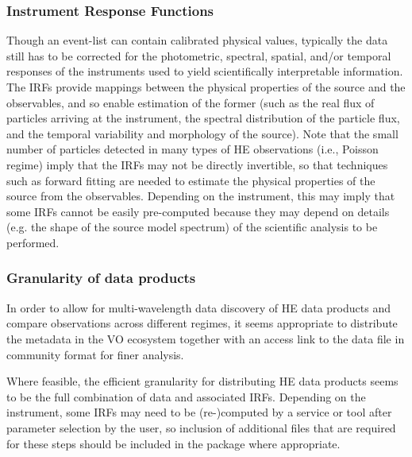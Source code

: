 \documentclass[11pt,a4paper]{ivoa}
\begin{document}
\subsubsection{Instrument Response Functions}

Though an event-list can contain calibrated physical values, typically the data still has to be corrected for the photometric, spectral, spatial, and/or temporal responses of the instruments used to yield scientifically interpretable information. The IRFs provide mappings between the physical properties of the source and the observables, and so enable estimation of the former (such as the real flux of particles arriving at the instrument, the spectral distribution of the particle flux, and the temporal variability and morphology of the source).  Note that the small number of particles detected in many types of HE observations (i.e., Poisson regime) imply that the IRFs may not be directly invertible, so that techniques such as forward fitting are needed to estimate the physical properties of the source from the observables.  Depending on the instrument, this may imply that some IRFs cannot be easily pre-computed because they may depend on details (e.g. the shape of the source model spectrum) of the scientific analysis to be performed.

\subsubsection{Granularity of data products}

In order to allow for multi-wavelength data discovery of HE data products and compare observations across different regimes, it seems appropriate to distribute the metadata in the VO ecosystem together with an access link to the data file in community format for finer analysis.

Where feasible, the efficient granularity for distributing HE data products seems to be the full combination of data and associated IRFs. Depending on the instrument, some IRFs may need to be (re-)computed by a service or tool after parameter selection by the user, so inclusion of additional files that are required for these steps should be included in the package where appropriate.

\end{document}
